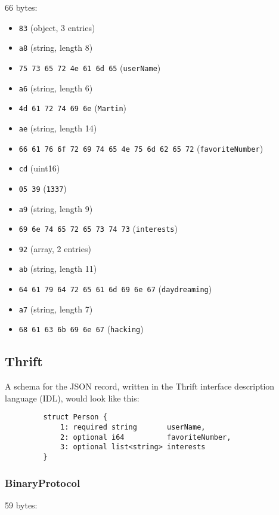 \documentclass[12pt, titlepage]{article}
\begin{document}
66 bytes:

\begin{itemize}
    \item \texttt{83} (object, 3 entries)
    \item \texttt{a8} (string, length 8)
    \item \texttt{75 73 65 72 4e 61 6d 65} (\texttt{userName})
    \item \texttt{a6} (string, length 6)
    \item \texttt{4d 61 72 74 69 6e} (\texttt{Martin})
    \item \texttt{ae} (string, length 14)
    \item \texttt{66 61 76 6f 72 69 74 65 4e 75 6d 62 65 72} (\texttt{favoriteNumber})
    \item \texttt{cd} (uint16)
    \item \texttt{05 39} (\texttt{1337})
    \item \texttt{a9} (string, length 9)
    \item \texttt{69 6e 74 65 72 65 73 74 73} (\texttt{interests})
    \item \texttt{92} (array, 2 entries)
    \item \texttt{ab} (string, length 11)
    \item \texttt{64 61 79 64 72 65 61 6d 69 6e 67} (\texttt{daydreaming})
    \item \texttt{a7} (string, length 7)
    \item \texttt{68 61 63 6b 69 6e 67} (\texttt{hacking})
\end{itemize}

\subsection{Thrift}

A schema for the JSON record, written in the Thrift interface description language (IDL), would look like this:

\begin{verbatim}
         struct Person {
             1: required string       userName,
             2: optional i64          favoriteNumber,
             3: optional list<string> interests
         }
\end{verbatim}

\subsubsection{BinaryProtocol}

59 bytes:
\end{document}
